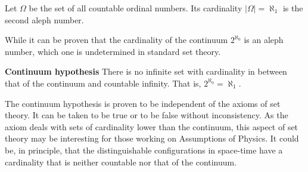\documentclass{bareminimum}
\begin{document}
\begin{defn}
	Let $\Omega$  be the set of all countable ordinal numbers. Its cardinality $|\Omega| = \aleph_1$ is the second aleph number.
\end{defn}

\begin{remark}
	 While it can be proven that the cardinality of the continuum $2^{\aleph_0}$ is an aleph number, which one is undetermined in standard set theory.
\end{remark}

\textbf{Continuum hypothesis}
	There is  no infinite set with cardinality in between that of the continuum and countable infinity. That is, $2^{\aleph_0} = \aleph_1$.

\begin{remark}
	The continuum hypothesis is proven to be independent of the axioms of set theory. It can be taken to be true or to be false without inconsistency. As the axiom deals with sets of cardinality lower than the continuum, this aspect of set theory may be interesting for those working on Assumptions of Physics. It could be, in principle, that the distinguishable configurations in space-time have a cardinality that is neither countable nor that of the continuum.
\end{remark}



\end{document}
